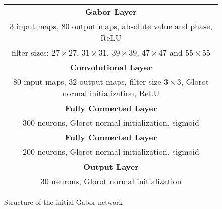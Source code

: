 \begin{figure}[h!]
	\scriptsize
	\centering
	\begin{tabular}{|c|}
	\hline
		\textbf{Gabor Layer}\\
		3 input maps, 80 output maps, absolute value and phase, ReLU\\
		filter sizes: $27 \times 27$, $31 \times 31$, $39 \times 39$, $47 \times 47$ and $55 \times 55$\\
	\hline
		\textbf{Convolutional Layer}\\
		80 input maps, 32 output maps, filter size $3\times3$, Glorot normal initialization, \ac{ReLU}\\
	\hline
		\textbf{Fully Connected Layer}\\
		300 neurons, Glorot normal initialization, sigmoid\\
	\hline
		\textbf{Fully Connected Layer}\\
		200 neurons, Glorot normal initialization, sigmoid\\
	\hline
		\textbf{Output Layer}\\
		30 neurons, Glorot normal initialization\\
	\hline
	\end{tabular}
	\caption{Structure of the initial Gabor network}
	\label{fig:gabor_structure_initial_network}
\end{figure}
